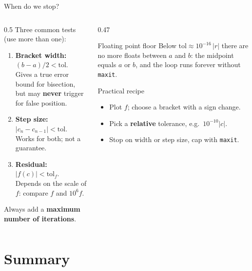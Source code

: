 \documentclass[aspectratio=169]{beamer}
\begin{document}
\begin{frame}{When do we stop?}
\begin{columns}[T]
\begin{column}{0.5\textwidth}
\small
Three common tests (use more than one):
\begin{enumerate}
  \item \textbf{Bracket width:} $(b - a)/2 < \text{tol}$.\\
        \scriptsize Gives a true error bound for bisection, but may \textbf{never} trigger for false position.\small
  \item \textbf{Step size:} $|c_n - c_{n-1}| < \text{tol}$.\\
        \scriptsize Works for both; not a guarantee.\small
  \item \textbf{Residual:} $|f(c)| < \text{tol}_f$.\\
        \scriptsize Depends on the scale of $f$: compare $f$ and $10^6 f$.\small
\end{enumerate}
\vspace{0.1cm}
Always add a \textbf{maximum number of iterations}.
\end{column}
\begin{column}{0.47\textwidth}
\begin{alertblock}{Floating point floor}
\small Below $\text{tol} \approx 10^{-16}\,|r|$ there are no more floats between $a$ and $b$: the midpoint equals $a$ or $b$, and the loop runs forever without \texttt{maxit}.
\end{alertblock}
\vspace{0.1cm}
\begin{exampleblock}{Practical recipe}
\small
\begin{itemize}
  \item Plot $f$; choose a bracket with a sign change.
  \item Pick a \textbf{relative} tolerance, e.g.\ $10^{-10}|c|$.
  \item Stop on width or step size, cap with \texttt{maxit}.
\end{itemize}
\end{exampleblock}
\end{column}
\end{columns}
\end{frame}

\section{Summary}
\end{document}
